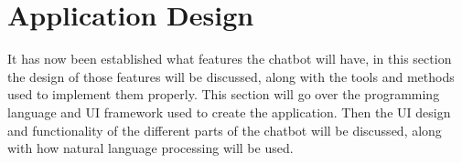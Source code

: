 \section{Application Design}

It has now been established what features the chatbot will have, in this section the design of those features will be discussed, along with the tools and methods used to implement them properly. This section will go over the programming language and UI framework used to create the application. Then the UI design and functionality of the different parts of the chatbot will be discussed, along with how natural language processing will be used.